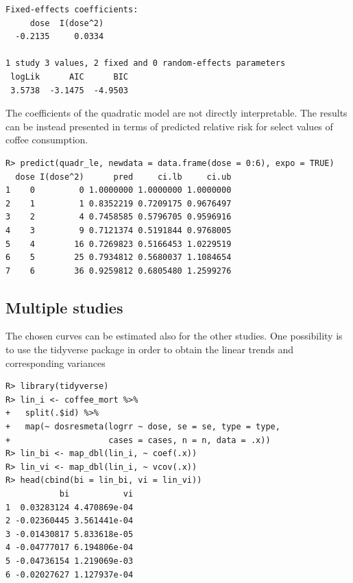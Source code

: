 \documentclass[11pt,a4paper,twoside,openany]{book}\usepackage{knitr}
\newcommand{\pkg}[1]{{\fontseries{b}\selectfont #1}}
\begin{document}
{\begin{knitrout}
\begin{kframe}
\begin{verbatim}
Fixed-effects coefficients:
     dose  I(dose^2)  
  -0.2135     0.0334  

1 study 3 values, 2 fixed and 0 random-effects parameters
 logLik      AIC      BIC  
 3.5738  -3.1475  -4.9503  
\end{verbatim}
\end{kframe}
\end{knitrout}

\noindent The coefficients of the quadratic model are not directly interpretable. The results can be instead presented in terms of predicted relative risk for select values of coffee consumption.
\begin{knitrout}\footnotesize
{}\color{fgcolor}\begin{kframe}
\begin{verbatim}
R> predict(quadr_le, newdata = data.frame(dose = 0:6), expo = TRUE)
  dose I(dose^2)      pred     ci.lb     ci.ub
1    0         0 1.0000000 1.0000000 1.0000000
2    1         1 0.8352219 0.7209175 0.9676497
3    2         4 0.7458585 0.5796705 0.9596916
4    3         9 0.7121374 0.5191844 0.9768005
5    4        16 0.7269823 0.5166453 1.0229519
6    5        25 0.7934812 0.5680037 1.1084654
7    6        36 0.9259812 0.6805480 1.2599276
\end{verbatim}
\end{kframe}
\end{knitrout}

\subsection{Multiple studies}

The chosen curves can be estimated also for the other studies. One possibility is to use the \pkg{tidyverse} package in order to obtain the linear trends and corresponding variances

\begin{knitrout}\footnotesize
{}\color{fgcolor}\begin{kframe}
\begin{verbatim}
R> library(tidyverse)
R> lin_i <- coffee_mort %>%
+   split(.$id) %>%
+   map(~ dosresmeta(logrr ~ dose, se = se, type = type,
+                    cases = cases, n = n, data = .x))
R> lin_bi <- map_dbl(lin_i, ~ coef(.x))
R> lin_vi <- map_dbl(lin_i, ~ vcov(.x))
R> head(cbind(bi = lin_bi, vi = lin_vi))
           bi           vi
1  0.03283124 4.470869e-04
2 -0.02360445 3.561441e-04
3 -0.01430817 5.833618e-05
4 -0.04777017 6.194806e-04
5 -0.04736154 1.219069e-03
6 -0.02027627 1.127937e-04
\end{verbatim}
\end{kframe}
\end{knitrout}

}
\end{document}
